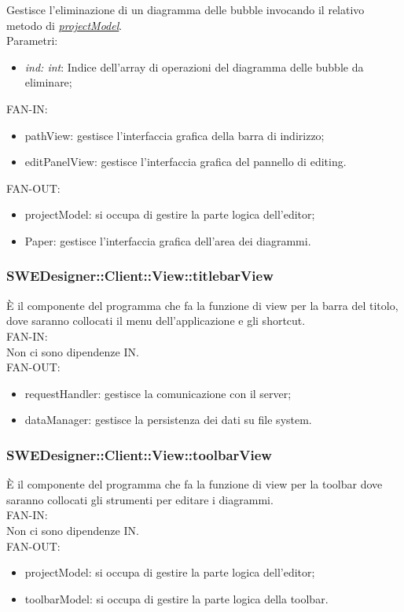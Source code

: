 \documentclass[../DefinizioneDiProdotto.tex]{subfiles}
\begin{document}
\begin{itemize}
\begin{itemize}
							Gestisce l'eliminazione di un diagramma delle bubble invocando il relativo metodo di \hyperlink{SWEDesigner::Model::projectModel}{\emph{projectModel}}.\\
							Parametri:
							\begin{itemize}
								\item \emph{ind: int}: Indice dell'array di operazioni del diagramma delle bubble da eliminare;
							\end{itemize}
						\end{itemize}
						FAN-IN:
						\begin{itemize}
							\item pathView: gestisce l'interfaccia grafica della barra di indirizzo;
							\item editPanelView: gestisce l'interfaccia grafica del pannello di editing.
						\end{itemize}
						FAN-OUT:
						\begin{itemize}
							\item projectModel: si occupa di gestire la parte logica dell'editor;
							\item Paper: gestisce l'interfaccia grafica dell'area dei diagrammi.
						\end{itemize}
					\end{itemize}
					

				\subsubsection{SWEDesigner::Client::View::titlebarView}
				È il componente del programma che fa la funzione di view per la barra del titolo, dove saranno collocati il menu dell’applicazione e gli shortcut.\\
					FAN-IN:\\
					Non ci sono dipendenze IN.\\
					FAN-OUT:
					\begin{itemize}
						\item requestHandler: gestisce la comunicazione con il server;
						\item dataManager: gestisce la persistenza dei dati su file system.
					\end{itemize}

				\subsubsection{SWEDesigner::Client::View::toolbarView}
				È il componente del programma che fa la funzione di view per la toolbar dove saranno collocati gli strumenti per editare i diagrammi.\\
					FAN-IN:\\
					Non ci sono dipendenze IN.\\
					FAN-OUT:
					\begin{itemize}
						\item projectModel: si occupa di gestire la parte logica dell'editor;
						\item toolbarModel: si occupa di gestire la parte logica della toolbar.
					\end{itemize}
\end{document}
